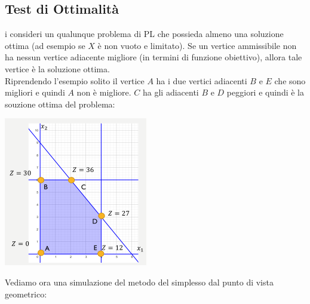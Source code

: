 \message{ !name(ro.tex)}\documentclass[a4paper,12pt, oneside]{book}
\begin{document}
\subsection{Test di Ottimalità}
i consideri un qualunque problema di PL che possieda almeno una
soluzione ottima (ad esempio se $X$ è non vuoto e limitato). Se un
vertice ammissibile non ha nessun vertice adiacente migliore
(in termini di funzione obiettivo), allora tale vertice è la soluzione
ottima.\\
Riprendendo l'esempio solito il vertice $A$ ha i due vertici adiacenti
$B$ e $E$ che sono migliori e quindi $A$ non è migliore. $C$ ha gli
adiacenti $B$ e $D$ peggiori e quindi è la souzione ottima del
problema:
\begin{center}
  \includegraphics[scale = 0.8]{img/simp7.png}
\end{center}
Vediamo ora una simulazione del metodo del simplesso dal punto di
vista geometrico:
\end{document}
